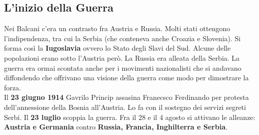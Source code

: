 \subsection{L'inizio della Guerra}
Nei Balcani c'era un contrasto fra Austria e Russia. Molti stati ottengono l'indipendenza, tra cui
la Serbia (che conteneva anche Croazia e Slovenia). Si forma così la \textbf{Iugoslavia} ovvero lo
Stato degli Slavi del Sud. Alcune delle popolazioni erano sotto l'Austria però. La Russia era alleata
della Serbia. La guerra era ormai scontata anche per i movimenti nazionalisti che si andavano
diffondendo che offrivano una visione della guerra come modo per dimostrare la forza.\\ 
[\baselineskip]
Il \textbf{23 giugno 1914} Gavrilo Princip assasina Franecsco Ferdinando per protesta dell'annessione
della Bosnia all'Austria. Lo fa con il sostegno dei servizi segreti Serbi. Il \textbf{23 luglio}
scoppia la guerra. Fra il 28 e il 4 agosto si attivano le alleanze: \textbf{Austria e Germania} 
contro \textbf{Russia, Francia, Inghilterra e Serbia}.

